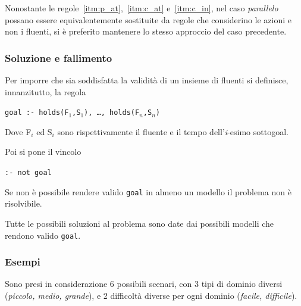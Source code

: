 \documentclass[a4paper,oneside,12pt]{book}
\begin{document}
    Nonostante le regole~\ref{itm:p_at},~\ref{itm:c_at} e~\ref{itm:c_in}, nel caso \textit{parallelo}
    possano essere equivalentemente sostituite da regole che considerino le azioni e non i fluenti,
    si è preferito mantenere lo stesso approccio del caso precedente.


    \subsubsection*{Soluzione e fallimento}
    Per imporre che sia soddisfatta la validità di un insieme di fluenti si definisce, innanzitutto, la regola
    \begin{center}
        \texttt{goal :- holds(F$_1$,S$_1$), \dots, holds(F$_n$,S$_n$)}
    \end{center}
    Dove F$_i$ ed S$_i$ sono rispettivamente il fluente e il tempo dell'\textit{i}-esimo sottogoal.

    Poi si pone il vincolo
    \begin{center}
        \texttt{:- not goal}
    \end{center}
    Se non è possibile rendere valido \texttt{goal} in almeno un modello il problema non è risolvibile.

    Tutte le possibili soluzioni al problema sono date dai possibili modelli che rendono valido \texttt{goal}.


    \subsubsection*{Esempi}
    Sono presi in considerazione 6 possibili scenari, con 3 tipi di dominio diversi (\textit{piccolo, medio, grande}),
    e 2 difficoltà diverse per ogni dominio (\textit{facile, difficile}).
\end{document}
